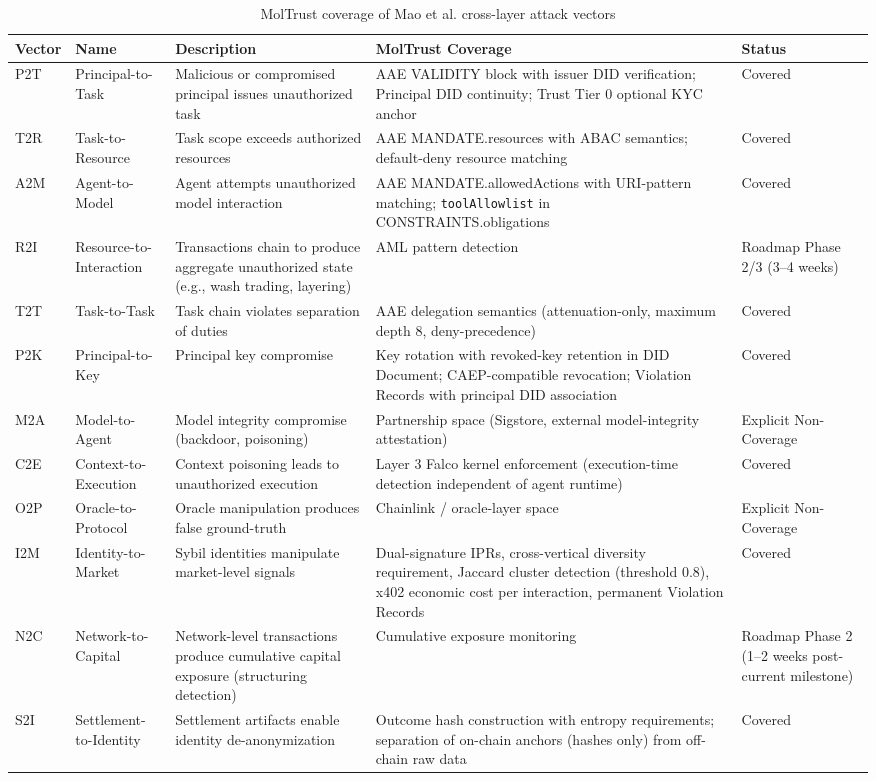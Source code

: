 \begin{table}[!htbp]
\centering
\footnotesize
\renewcommand{\arraystretch}{1.15}
\caption{MolTrust coverage of Mao et al. cross-layer attack vectors}
\begin{tabular}{@{}p{1.0cm} p{2.4cm} p{4.0cm} p{4.3cm} p{2.5cm}@{}}
\toprule
Vector & Name & Description & MolTrust Coverage & Status \\
\midrule
P2T & Principal-to-Task & Malicious or compromised principal issues unauthorized task & AAE VALIDITY block with issuer DID verification; Principal DID continuity; Trust Tier 0 optional KYC anchor & Covered \\
T2R & Task-to-Resource & Task scope exceeds authorized resources & AAE MANDATE.resources with ABAC semantics; default-deny resource matching & Covered \\
A2M & Agent-to-Model & Agent attempts unauthorized model interaction & AAE MANDATE.allowedActions with URI-pattern matching; \texttt{toolAllowlist} in CONSTRAINTS.obligations & Covered \\
R2I & Resource-to-Interaction & Transactions chain to produce aggregate unauthorized state (e.g., wash trading, layering) & AML pattern detection & Roadmap Phase 2/3 (3–4 weeks) \\
T2T & Task-to-Task & Task chain violates separation of duties & AAE delegation semantics (attenuation-only, maximum depth 8, deny-precedence) & Covered \\
P2K & Principal-to-Key & Principal key compromise & Key rotation with revoked-key retention in DID Document; CAEP-compatible revocation; Violation Records with principal DID association & Covered \\
M2A & Model-to-Agent & Model integrity compromise (backdoor, poisoning) & Partnership space (Sigstore, external model-integrity attestation) & Explicit Non-Coverage \\
C2E & Context-to-Execution & Context poisoning leads to unauthorized execution & Layer 3 Falco kernel enforcement (execution-time detection independent of agent runtime) & Covered \\
O2P & Oracle-to-Protocol & Oracle manipulation produces false ground-truth & Chainlink / oracle-layer space & Explicit Non-Coverage \\
I2M & Identity-to-Market & Sybil identities manipulate market-level signals & Dual-signature IPRs, cross-vertical diversity requirement, Jaccard cluster detection (threshold 0.8), x402 economic cost per interaction, permanent Violation Records & Covered \\
N2C & Network-to-Capital & Network-level transactions produce cumulative capital exposure (structuring detection) & Cumulative exposure monitoring & Roadmap Phase 2 (1–2 weeks post-current milestone) \\
S2I & Settlement-to-Identity & Settlement artifacts enable identity de-anonymization & Outcome hash construction with entropy requirements; separation of on-chain anchors (hashes only) from off-chain raw data & Covered \\
\bottomrule
\end{tabular}
\end{table}

